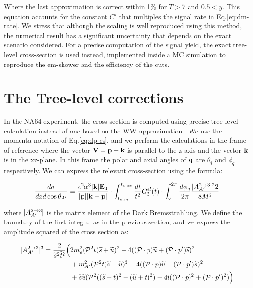 Where the last approximation is correct within 1\% for $T>7$ and $0.5 < y$. This equation accounts for the constant $C'$ that multiples the signal rate in Eq.\ref{eq:dm-rate}. We stress that although the scaling is well reproduced using this method, the numerical result has a significant uncertainty that depends on the exact scenario considered. For a precise computation of the signal yield, the exact tree-level cross-section is used instead, implemented inside a MC simulation to reproduce the em-shower and the efficiency of the cuts.



\section{The Tree-level corrections}
\label{appA:sec:cross-section-tl}

In the NA64 experiment, the cross section is computed using precise tree-level calculation instead of one based on the WW approximation \cite{DMsimulation}. We use the momenta notation of Eq.\ref{eq:dp-cs}, and we perform the calculations in the frame of reference where the vector $\bf{V} = \bf{p} - \bf{k}$ is parallel to the z-axis and the vector $\bf{k}$ is in the xz-plane. In this frame the polar and axial angles of $\bf{q}$ are $\theta_q$ and $\phi_q$ respectively. We can express the relevant cross-section using the formula:

\begin{equation}
  \label{eq:cs-tl}
  \frac{d\sigma}{dx d\cos{\theta_{A'}}} = \frac{\epsilon^2 \alpha^3 |\bf{k}| E_0}{|\bf{p}| |\bf{k} - \bf{p}|} \cdot \int_{t_{min}}^{t_{max}} \frac{dt}{t^2} G^{el}_{2}(t) \cdot \int_0^{2\pi} \frac{d\phi_q}{2\pi} \frac{|A^{2 \to 3}_{A'}|^22}{8 M^2}
\end{equation}

 where $|A^{2 \to 3}_{A'}|$ is the matrix element of the Dark Bremsstrahlung. We define the boundary of the first integral as in the previous section, and we express the amplitude squared of the cross section as:

\begin{equation}
  \label{eq:cs-dp-amp}
  \begin{aligned}
    |A^{2 \to 3}_{A'}|^2 = \frac{2}{\widetilde{s}^2\widetilde{t}^2} \Big( &2m^2_e (\mathcal{P}^2 t (\widetilde{s} + \widetilde{u})^2 - 4((\mathcal{P} \cdot p)\widetilde{u} + (\mathcal{P} \cdot p')\widetilde{s})^2  \\
      &+ m^2_{A'}(\mathcal{P}^2 t (\widetilde{s} - \widetilde{u})^2 -4((\mathcal{P}\cdot p)\widetilde{u} + (\mathcal{P}\cdot p')\widetilde{s})^2 \\
      &+ \widetilde{s}\widetilde{u}(\mathcal{P}^2 ((\widetilde{s} + t)^2 + (\widetilde{u}+t)^2) - 4 t ((\mathcal{P} \cdot p)^2 + (\mathcal{P} \cdot p')^2) \Big)
  \end{aligned}    
\end{equation}

